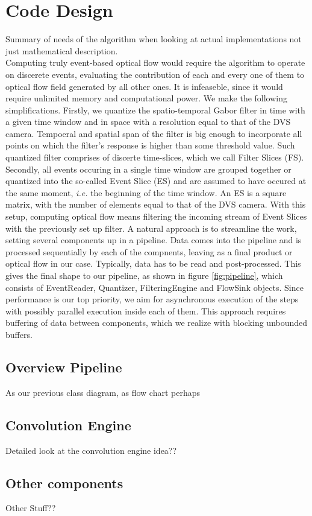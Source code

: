 \section{Code Design}
Summary of needs of the algorithm when looking at actual implementations not just mathematical description.
\vspace*{2cm} \\ 

Computing truly event-based optical flow would require the algorithm to operate on discerete events, evaluating the contribution of each and every one of them to optical flow field generated by all other ones.
It is infeaseble, since it would require unlimited memory and computational power.
We make the following simplifications.
Firstly, we quantize the spatio-temporal Gabor filter in time with a given time window and in space with a resolution equal to that of the DVS camera.
Tempoeral and spatial span of the filter is big enough to incorporate all points on which the filter's response is higher than some threshold value.
Such quantized filter comprises of discerte time-slices, which we call Filter Slices (FS).
Secondly, all events occuring in a single time window are grouped together or quantized into the so-called Event Slice (ES) and are assumed to have occured at the same moment, \emph{i.e.} the beginning of the time window. 
An ES is a square matrix, with the number of elements equal to that of the DVS camera. 
With this setup, computing optical flow means filtering the incoming stream of Event Slices with the previously set up filter.
A natural approach is to streamline the work, setting several components up in a pipeline.
Data comes into the pipeline and is processed sequentially by each of the compnents, leaving as a final product or optical flow in our case. 
Typically, data has to be read and post-processed.
This gives the final shape to our pipeline, as shown in figure \ref{fig:pipeline}, which consists of EventReader, Quantizer, FilteringEngine and FlowSink objects.
Since performance is our top priority, we aim for asynchronous execution of the steps with possibly parallel execution inside each of them.
This approach requires buffering of data between components, which we realize with blocking unbounded buffers.
\subsection{Overview Pipeline}
As our previous class diagram, as flow chart perhaps
\subsection{Convolution Engine}
Detailed look at the convolution engine idea??
\subsection{Other components}
Other Stuff??
